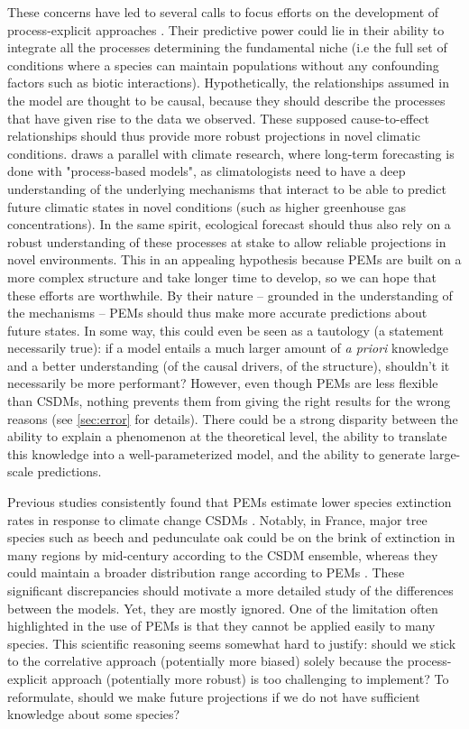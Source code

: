 These concerns have led to several calls to focus efforts on the development of process-explicit approaches \citep{Evans2012, Connolly2017, Urban2016, Pilowsky2022}. Their predictive power could lie in their ability to integrate all the processes determining the fundamental niche (i.e the full set of conditions where a species can maintain populations without any confounding factors such as biotic interactions). 
Hypothetically, the relationships assumed in the model are thought to be causal, because they should describe the processes that have given rise to the data we observed. These supposed cause-to-effect relationships should thus provide more robust projections in novel climatic conditions. \citet{Evans2012} draws a parallel with climate research, where long-term forecasting is done with "process-based models", as climatologists need to have a deep understanding of the underlying mechanisms that interact to be able to predict future climatic states in novel conditions (such as higher greenhouse gas concentrations). In the same spirit, ecological forecast should thus also rely on a robust understanding of these processes at stake to allow reliable projections in novel environments. This in an appealing hypothesis because PEMs are built on a more complex structure and take longer time to develop, so we can hope that these efforts are worthwhile. By their nature -- grounded in the understanding of the mechanisms -- PEMs should thus make more accurate predictions about future states. 
In some way, this could even be seen as a tautology (a statement necessarily true): if a model entails a much larger amount of \emph{a priori} knowledge and a better understanding (of the causal drivers, of the structure), shouldn't it necessarily be more performant? 
However, even though PEMs are less flexible than CSDMs, nothing prevents them from giving the right results for the wrong reasons (see \autoref{sec:error} for details). There could be a strong disparity between the ability to explain a phenomenon at the theoretical level, the ability to translate this knowledge into a well-parameterized model, and the ability to generate large-scale predictions.

Previous studies consistently found that PEMs estimate lower species extinction rates in response to climate change CSDMs \citep{Morin2009, Kearney2010, Cheaib2012, Gritti2013}. Notably, in France, major tree species such as beech and pedunculate oak could be on the brink of extinction in many regions by mid-century according to the CSDM ensemble, whereas they could maintain a broader distribution range according to PEMs \citep{Cheaib2012}. These significant discrepancies should motivate a more detailed study of the differences between the models. Yet, they are mostly ignored. One of the limitation often highlighted in the use of PEMs is that they cannot be applied easily to many species. This scientific reasoning seems somewhat hard to justify: should we stick to the correlative approach (potentially more biased) solely because the process-explicit approach (potentially more robust) is too challenging to implement? To reformulate, should we make future projections if we do not have sufficient knowledge about some species?

